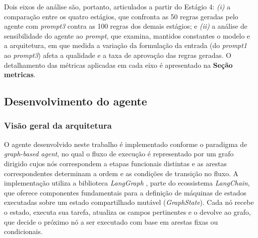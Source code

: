 Dois eixos de análise são, portanto, articulados a partir do Estágio 4: 
\textit{(i)} a comparação entre os quatro estágios, que confronta as 50 regras geradas pelo agente com \textit{prompt3} contra as 100 regras dos demais estágios; e \textit{(ii)} a análise de sensibilidade do agente ao \textit{prompt}, que examina, mantidos constantes o modelo e a arquitetura, em que medida a variação da formulação da entrada (do \textit{prompt1} ao \textit{prompt3}) afeta a qualidade e a taxa de aprovação das regras geradas. 
O detalhamento das métricas aplicadas em cada eixo é apresentado na \textbf{Seção metricas}.


\subsection{Desenvolvimento do agente}

\subsubsection{Visão geral da arquitetura}

O agente desenvolvido neste trabalho é implementado conforme o paradigma de \textit{graph-based agent}, no qual o fluxo de execução é representado por um grafo dirigido cujos nós correspondem a etapas funcionais distintas e as arestas correspondentes determinam a ordem e as condições de transição no fluxo. 
A implementação utiliza a biblioteca \textit{LangGraph} \cite{langgraph2024}, parte do ecossistema \textit{LangChain}, que oferece componentes fundamentais para a definição de máquinas de estados executadas sobre um estado compartilhado mutável (\textit{GraphState}). 
Cada nó recebe o estado, executa sua tarefa, atualiza os campos pertinentes e o devolve ao grafo, que decide o próximo nó a ser executado com base em arestas fixas ou condicionais.

